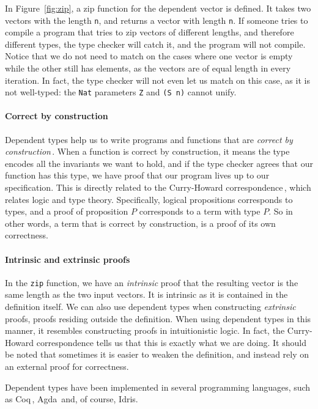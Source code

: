 In Figure~\ref{fig:zip}, a zip function for the dependent vector is defined. It takes two vectors with the length \texttt{n}, and returns a vector with length \texttt{n}. If someone tries to compile a program that tries to zip vectors of different lengths, and therefore different types, the type checker will catch it, and the program will not compile. Notice that we do not need to match on the cases where one vector is empty while the other still has elements, as the vectors are of equal length in every iteration. In fact, the type checker will not even let us match on this case, as it is not well-typed: the \texttt{Nat} parameters \texttt{Z} and \texttt{(S n)} cannot unify.

\paragraph{Correct by construction} Dependent types help us to write programs and functions that are \emph{correct by construction}\,\cite[p. 464]{Pierce:TypeSystems}. When a function is correct by construction, it means the type encodes all the invariants we want to hold, and if the type checker agrees that our function has this type, we have proof that our program lives up to our specification. This is directly related to the Curry-Howard correspondence\,\cite[pp. 108]{Pierce:TypeSystems}, which relates logic and type theory. Specifically, logical propositions corresponds to types, and a proof of proposition $P$ corresponds to a term with type $P$. So in other words, a term that is correct by construction, is a proof of its own correctness.

\paragraph{Intrinsic and extrinsic proofs} In the \texttt{zip} function, we have an \emph{intrinsic} proof that the resulting vector is the same length as the two input vectors. It is intrinsic as it is contained in the definition itself. We can also use dependent types when constructing \emph{extrinsic} proofs, proofs residing outside the definition. When using dependent types in this manner, it resembles constructing proofs in intuitionistic logic. In fact, the Curry-Howard correspondence tells us that this is exactly what we are doing. It should be noted that sometimes it is easier to weaken the definition, and instead rely on an external proof for correctness.

Dependent types have been implemented in several programming languages, such as Coq\,\cite{Coq}, Agda\,\cite{Agda} and, of course, Idris. 

